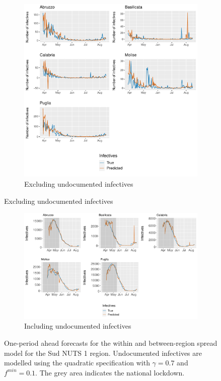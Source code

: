 \documentclass[12pt]{article}
\begin{document}
\begin{appendices}
        \begin{figure}[H]
    	    \centering
    	    \begin{subfigure}{\textwidth}
    	      \centering
    	      \includegraphics[width=0.94\linewidth]{output/model_between_lag14_forecast_start20_Sud_rolling.pdf}
    	      \caption{Excluding undocumented infectives}
    	      \label{fig:forecast_between_sud_regular}
    	    \end{subfigure}
        \end{figure}
        \begin{figure}[H]\ContinuedFloat
    	    \begin{subfigure}{\textwidth}
    	      \centering
    	      \includegraphics[width=0.94\linewidth]{output/model_between_lag14_forecast_start20_Sud_UndocQuadratic_rolling.pdf}
    	      \caption{Including undocumented infectives}
    	      \label{fig:forecast_between_sud_undoc}
    	    \end{subfigure}
    	    \caption{One-period ahead forecasts for the within and between-region spread model for the Sud NUTS 1 region. Undocumented infectives are modelled using the quadratic specification with $\gamma = 0.7$ and $f^{min}=0.1$. The grey area indicates the national lockdown.}
    	    \label{fig:forecast_between_sud}
        \end{figure}
        

\end{appendices}
\end{document}
